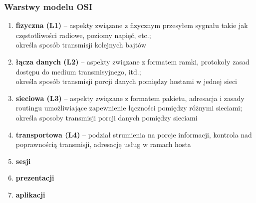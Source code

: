 \documentclass[11pt,aspectratio=169]{beamer}
\begin{document}
\begin{frame}[fragile]

\frametitle{Warstwy modelu OSI}

\begin{enumerate}
	\item \textbf{fizyczna (L1)} – aspekty związane z fizycznym przesyłem sygnału takie jak częstotliwości radiowe, poziomy napięć, etc.;\\
		określa sposób transmisji kolejnych bajtów
	\item \textbf{łącza danych (L2)} – aspekty związane z formatem ramki, protokoły zasad dostępu do medium transmisyjnego, itd.;\\
		określa sposób transmisji porcji danych pomiędzy hostami w jednej sieci
	\item \textbf{sieciowa (L3)} – aspekty związane z formatem pakietu, adresacja i zasady routingu umożliwiające zapewnienie łączności pomiędzy różnymi sieciami;\\
		określa sposoby transmisji porcji danych pomiędzy sieciami
	\item \textbf{transportowa (L4)} – podział strumienia na porcje informacji, kontrola nad poprawnością transmisji, adresację usług w ramach hosta
	\item \textbf{sesji}
	\item \textbf{prezentacji}
	\item \textbf{aplikacji}
\end{enumerate}

\end{frame}
\end{document}
